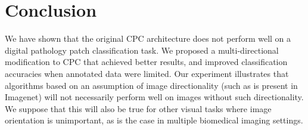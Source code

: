 \section{Conclusion}
\label{sec:conclusion}
We have shown that the original CPC architecture does not perform well on a digital pathology patch classification task. We proposed a multi-directional modification to CPC that achieved better results, and improved classification accuracies when annotated data were limited. Our experiment illustrates that algorithms based on an assumption of image directionality (such as is present in Imagenet) will not necessarily perform well on images without such directionality. We suppose that this will also be true for other visual tasks where image orientation is unimportant, as is the case in multiple biomedical imaging settings.  